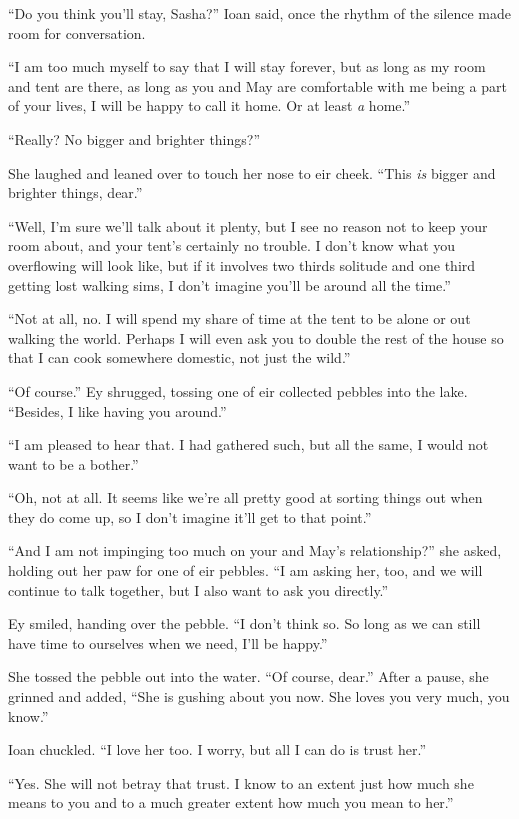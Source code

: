 ``Do you think you'll stay, Sasha?'' Ioan said, once the rhythm of the silence made room for conversation.

``I am too much myself to say that I will stay forever, but as long as my room and tent are there, as long as you and May are comfortable with me being a part of your lives, I will be happy to call it home. Or at least \emph{a} home.''

``Really? No bigger and brighter things?''

She laughed and leaned over to touch her nose to eir cheek. ``This \emph{is} bigger and brighter things, dear.''

``Well, I'm sure we'll talk about it plenty, but I see no reason not to keep your room about, and your tent's certainly no trouble. I don't know what you overflowing will look like, but if it involves two thirds solitude and one third getting lost walking sims, I don't imagine you'll be around all the time.''

``Not at all, no. I will spend my share of time at the tent to be alone or out walking the world. Perhaps I will even ask you to double the rest of the house so that I can cook somewhere domestic, not just the wild.''

``Of course.'' Ey shrugged, tossing one of eir collected pebbles into the lake. ``Besides, I like having you around.''

``I am pleased to hear that. I had gathered such, but all the same, I would not want to be a bother.''

``Oh, not at all. It seems like we're all pretty good at sorting things out when they do come up, so I don't imagine it'll get to that point.''

``And I am not impinging too much on your and May's relationship?'' she asked, holding out her paw for one of eir pebbles. ``I am asking her, too, and we will continue to talk together, but I also want to ask you directly.''

Ey smiled, handing over the pebble. ``I don't think so. So long as we can still have time to ourselves when we need, I'll be happy.''

She tossed the pebble out into the water. ``Of course, dear.'' After a pause, she grinned and added, ``She is gushing about you now. She loves you very much, you know.''

Ioan chuckled. ``I love her too. I worry, but all I can do is trust her.''

``Yes. She will not betray that trust. I know to an extent just how much she means to you and to a much greater extent how much you mean to her.''

